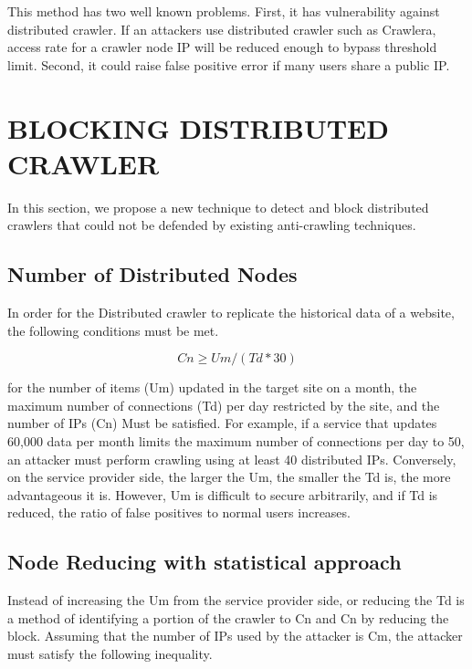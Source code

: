 \documentclass[sigconf,anonymous=false]{acmart}
\begin{document}
\begin{enumerate}
This method has two well known problems. 
First, it has vulnerability against distributed crawler. If an attackers use distributed crawler such as Crawlera, access rate for a crawler node IP will be reduced enough to bypass threshold limit.
Second, it could raise false positive error if many users share a public IP.
\newline


\end{enumerate}


%
%
\section{BLOCKING DISTRIBUTED CRAWLER}
In this section, we propose a new technique to detect and block distributed crawlers that could not be defended by existing anti-crawling techniques.

\subsection{Number of Distributed Nodes}
In order for the Distributed crawler to replicate the historical data of a website, the following conditions must be met. 

  \begin{displaymath}
Cn \geq Um / (Td * 30) 
  \end{displaymath}


for the number of items (Um) updated in the target site on a month, the maximum number of connections (Td) per day restricted by the site, and the number of IPs (Cn) Must be satisfied.
For example, if a service that updates 60,000 data per month limits the maximum number of connections per day to 50, an attacker must perform crawling using at least 40 distributed IPs. Conversely, on the service provider side, the larger the Um, the smaller the Td is, the more advantageous it is. However, Um is difficult to secure arbitrarily, and if Td is reduced, the ratio of false positives to normal users increases.


\subsection{Node Reducing with statistical approach}
Instead of increasing the Um from the service provider side, or reducing the Td is a method of identifying a portion of the crawler to Cn and Cn by reducing the block.
Assuming that the number of IPs used by the attacker is Cm, the attacker must satisfy the following inequality.
\end{document}
